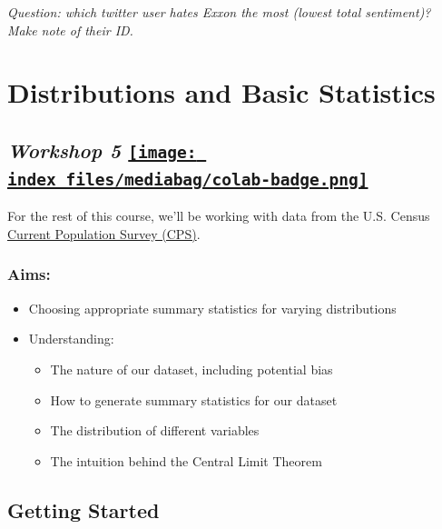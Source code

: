 \documentclass[
  letterpaper,
  DIV=11,
  numbers=noendperiod]{scrreprt}
\providecommand{\tightlist}{%
  \setlength{\itemsep}{0pt}\setlength{\parskip}{0pt}}\usepackage{longtable,booktabs,array}
\begin{document}
\emph{Question: which twitter user hates Exxon the most (lowest total
sentiment)? Make note of their ID.}


\hypertarget{distributions-and-basic-statistics}{%
\chapter{Distributions and Basic
Statistics}\label{distributions-and-basic-statistics}}

\hypertarget{workshop-5-open-in-colab}{%
\section[\emph{Workshop 5} ]{\texorpdfstring{\emph{Workshop 5}
\href{https://colab.research.google.com/github/oballinger/QM2/blob/main/notebooks/W05.\%20Distributions\%20and\%20Basic\%20Statistics.ipynb}{\protect\texttt{[image: index\_files/mediabag/colab-badge.png]}}}{Workshop 5 Open In Colab}}\label{workshop-5-open-in-colab}}

For the rest of this course, we'll be working with data from the U.S.
Census \href{https://www.census.gov/programs-surveys/cps.html}{Current
Population Survey (CPS)}.

\hypertarget{aims-2}{%
\subsection{Aims:}\label{aims-2}}

\begin{itemize}
\item
  Choosing appropriate summary statistics for varying distributions
\item
  Understanding:

  \begin{itemize}
  \tightlist
  \item
    The nature of our dataset, including potential bias
  \item
    How to generate summary statistics for our dataset
  \item
    The distribution of different variables
  \item
    The intuition behind the Central Limit Theorem
  \end{itemize}
\end{itemize}

\hypertarget{getting-started-1}{%
\section{Getting Started}\label{getting-started-1}}
\end{document}
